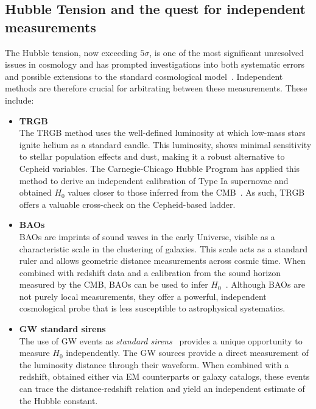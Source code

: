 \subsection{Hubble Tension and the quest for independent measurements}
The Hubble tension, now exceeding $5\sigma$, is one of the most significant unresolved issues in cosmology and has prompted investigations into both systematic errors and possible extensions to the standard cosmological model~\citep{annurev:tension}.
Independent methods are therefore crucial for arbitrating between these measurements. These include:
\vspace{-1em}
\begin{itemize}
    \item \textbf{\ac{TRGB}}\\
    The \ac{TRGB} method uses the well-defined luminosity at which low-mass stars ignite helium as a standard candle. This luminosity, shows minimal sensitivity to stellar population effects and dust, making it a robust alternative to Cepheid variables. The Carnegie-Chicago Hubble Program has applied this method to derive an independent calibration of Type Ia supernovae and obtained $H_0$ values closer to those inferred from the \ac{CMB}~\citep{freedman2024status}. As such, \ac{TRGB} offers a valuable cross-check on the Cepheid-based ladder.
    \vspace{-1em}
    \item \textbf{\acp{BAO}}\\
    \acp{BAO} are imprints of sound waves in the early Universe, visible as a characteristic scale in the clustering of galaxies. This scale acts as a standard ruler and allows geometric distance measurements across cosmic time. When combined with redshift data and a calibration from the sound horizon measured by the \ac{CMB}, \acp{BAO} can be used to infer $H_0$~\citep{cuceu2019baryon,alam2021completed}. Although \acp{BAO} are not purely local measurements, they offer a powerful, independent cosmological probe that is less susceptible to astrophysical systematics.
    \vspace{-1em}
    \item \textbf{\Acf{GW} standard sirens}\\
    The use of \acf{GW} events as \textit{standard sirens}~\citep{schutz1986determining} provides a unique opportunity to measure $H_0$ independently.  The \ac{GW} sources provide a direct measurement of the luminosity distance through their waveform. When combined with a redshift, obtained either via \acf{EM} counterparts or galaxy catalogs, these events can trace the distance-redshift relation and yield an independent estimate of the Hubble constant.


\end{itemize}
